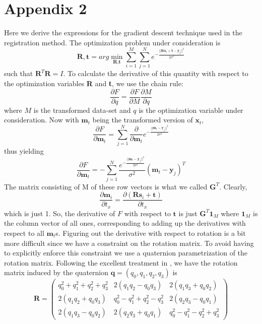 \documentclass[11pt, a4paper]{article}
\begin{document}
\section*{Appendix 2}
Here we derive the expressions for the gradient descent technique used in the registration method.
\newline \linebreak
\noindent The optimization problem under consideration is $$\textbf{R}, \textbf{t} = arg\min_{\textbf{R}, \textbf{t}} \sum_{i=1}^M \sum_{j=1}^N e^{-\frac{|| \textbf{Rx}_i + \textbf{t} - \textbf{y}_j ||^2}{2 \sigma^2}}$$ such that $\textbf{R}^T \textbf{R} = I$. To calculate the derivative of this quantity with respect to the optimization variables \textbf{R} and \textbf{t}, we use the chain rule:
$$\frac{\partial F}{\partial q} = \frac{\partial F}{\partial M} \frac{\partial M}{\partial q}$$ where $M$ is the transformed data-set and $q$ is the optimization variable under consideration. Now with $\textbf{m}_t$ being the transformed version of $\textbf{x}_t$, $$\frac{\partial F}{\partial \textbf{m}_t} = \sum_{j=1}^N \frac{\partial}{\partial \textbf{m}_t} e^{-\frac{|| \textbf{m}_t - \textbf{y}_j ||^2}{2 \sigma^2}}$$ thus yielding $$\frac{\partial F}{\partial \textbf{m}_t} = -\sum_{j=1}^N \frac{e^{-\frac{|| \textbf{m}_t - \textbf{y}_j ||^2}{2 \sigma^2}}}{\sigma^2} \left( \textbf{m}_t-\textbf{y}_j \right)^T$$ The matrix consisting of M of these row vectors is what we called $\textbf{G}^T$.
\newline \linebreak
\noindent Clearly, $$\frac{\partial \textbf{m}_i}{\partial t_x} = \frac{\partial \left(\textbf{Rs}_i + \textbf{t}\right)}{\partial t_x}$$ which is just 1. So, the derivative of $F$ with respect to $\textbf{t}$ is just $\textbf{G}^T \textbf{1}_M$ where $\textbf{1}_M$ is the column vector of all ones, corresponding to adding up the derivatives with respect to all $\textbf{m}_t$s.
\newline \linebreak
\noindent Figuring out the derivative with respect to rotation is a bit more difficult since we have a constraint on the rotation matrix. To avoid having to explicitly enforce this constraint we use a quaternion parametrization of the rotation matrix. Following the excellent treatment in \cite{quatParam}, we have the rotation matrix induced by the quaternion $\textbf{q} = (q_0, q_1, q_2, q_3)$ is
$$\textbf{R} = \begin{pmatrix}
q_0^2 + q_1^2 + q_2^2 + q_3^2 & 2(q_1 q_2-q_0 q_3) & 2(q_1 q_3 + q_0 q_2) \\
2(q_1 q_2 + q_0 q_3) & q_0^2 - q_1^2 + q_2^2 - q_3^2 & 2(q_2 q_3 - q_0 q_1) \\
2(q_1 q_3 - q_0 q_2) & 2(q_2 q_3 + q_0 q_1) & q_0^2 - q_1^2 - q_2^2 + q_3^2
\end{pmatrix}$$
\end{document}
